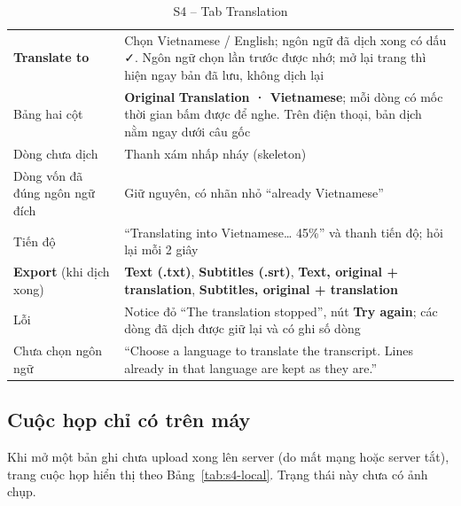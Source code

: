 \documentclass[12pt,a4paper]{report}
\newcommand{\ui}[1]{\textbf{#1}}
\begin{document}
\begin{table}[htbp]
  \centering
  \caption{S4 -- Tab Translation}
  \label{tab:s4-translation}
  \small
  \begin{tabularx}{\linewidth}{@{}P{3.8cm}L@{}}
    \toprule
     &  \\
    \midrule
    \ui{Translate to} & Chọn Vietnamese / English; ngôn ngữ đã dịch xong có dấu ✓. Ngôn ngữ chọn lần trước được
      nhớ; mở lại trang thì hiện ngay bản đã lưu, không dịch lại \\
    Bảng hai cột & \ui{Original} \textbar{} \ui{Translation · Vietnamese}; mỗi dòng có mốc thời gian bấm được để nghe. Trên
      điện thoại, bản dịch nằm ngay dưới câu gốc \\
    Dòng chưa dịch & Thanh xám nhấp nháy (skeleton) \\
    Dòng vốn đã đúng ngôn ngữ đích & Giữ nguyên, có nhãn nhỏ ``already Vietnamese'' \\
    Tiến độ & ``Translating into Vietnamese\ldots{} 45\%'' và thanh tiến độ; hỏi lại mỗi 2 giây \\
    \ui{Export} (khi dịch xong) & \ui{Text (.txt)}, \ui{Subtitles (.srt)}, \ui{Text, original + translation},
      \ui{Subtitles, original + translation} \\
    Lỗi & Notice đỏ ``The translation stopped'', nút \ui{Try again}; các dòng đã dịch được giữ lại và có ghi số dòng \\
    Chưa chọn ngôn ngữ & ``Choose a language to translate the transcript. Lines already in that language are kept
      as they are.'' \\
    \bottomrule
  \end{tabularx}
\end{table}

\subsection{Cuộc họp chỉ có trên máy}

Khi mở một bản ghi chưa upload xong lên server (do mất mạng hoặc server tắt), trang cuộc họp hiển thị theo
Bảng~\ref{tab:s4-local}. Trạng thái này chưa có ảnh chụp.
\end{document}
